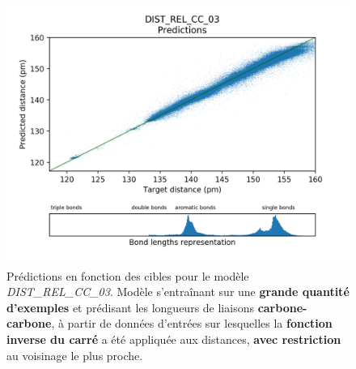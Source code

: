 \begin{figure}[!h]
	\centering
	
	\includegraphics[scale=0.75]{../figures/DIST_REL_CC_03/DIST_REL_CC_03_preds_targets.png}	
	
	\caption{Prédictions en fonction des cibles pour le modèle \emph{DIST\_REL\_CC\_03}. Modèle s'entraînant sur une \textbf{grande quantité d'exemples} et prédisant les longueurs de liaisons \textbf{carbone-carbone}, à partir de données d'entrées sur lesquelles la \textbf{fonction inverse du carré} a été appliquée aux distances, \textbf{avec restriction} au voisinage le plus proche.}
	
\end{figure}


